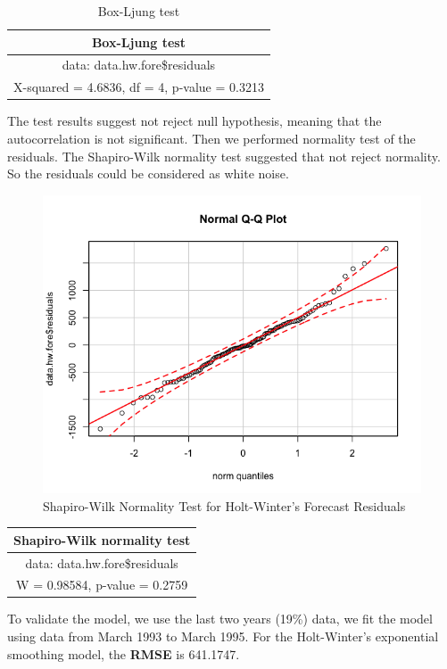 \documentclass[journal, a4paper]{IEEEtran}
\begin{document}
 
\begin{table}[H]
\caption{Box-Ljung test}
\label{table:box_test}
\centering
\begin{tabular}{|c|}
\hline
Box-Ljung test  \\ \hline
data:  data.hw.fore\$residuals  \\  \hline
X-squared = 4.6836, df = 4, p-value = 0.3213  \\
\hline
\end{tabular}
\end{table}
The test results suggest not reject null hypothesis, meaning that the autocorrelation is not significant.  
Then we performed normality test of the residuals. The Shapiro-Wilk normality test suggested that not reject normality. So the residuals could be considered as white noise.

\begin{figure}[H]
\begin{center}
\includegraphics[scale=0.25]{fig1/qqplot.png}
\caption{Shapiro-Wilk Normality Test for Holt-Winter's Forecast Residuals}
\label{fig1:qqplot}
\end{center}
\end{figure}

\begin{table}[H]
\centering
\begin{tabular}{|c|}
\hline
Shapiro-Wilk normality test  \\  \hline
data:  data.hw.fore\$residuals  \\  \hline
W = 0.98584, p-value = 0.2759  \\
\hline
\end{tabular}
\end{table}
To validate the model, we use the last two years (19\%) data, we fit the model using data from March 1993 to March 1995. 
For the Holt-Winter's exponential smoothing model, the \textbf{RMSE} is 641.1747.
\end{document}
